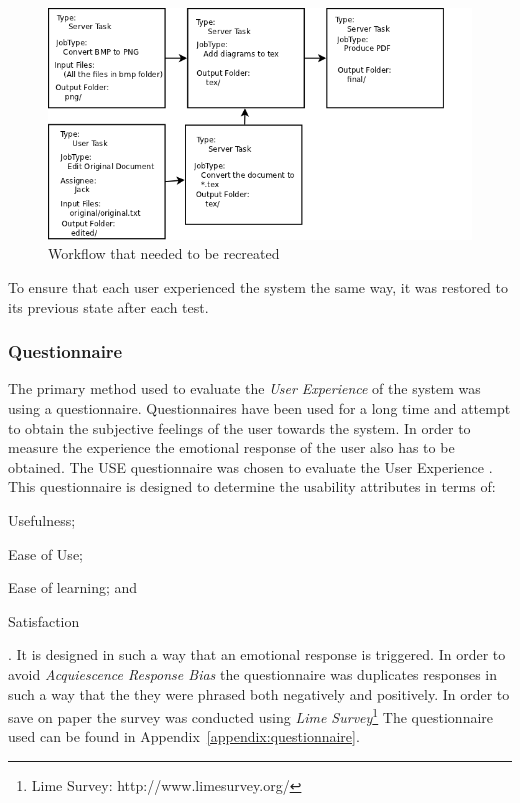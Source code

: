 \documentclass[12pt,a4paper]{report}
\begin{document}
\begin{figure}[!h]
    \begin{center}
        \includegraphics[scale=0.45]{figures/workflow.png}
    \end{center}
    \caption{Workflow that needed to be recreated}
    \label{eval:workflow}
\end{figure}
To ensure that each user experienced the system the same way, it was restored to
its previous state after each test. 

\subsubsection{Questionnaire}
The primary method used to evaluate the \emph{User Experience} of the system was
using a questionnaire. Questionnaires have been used for a long time and attempt
to obtain the subjective feelings of the user towards the
system\cite{Chin:1988:DIM:57167.57203}. In order to measure the experience the
emotional response of the user also has to be obtained. The USE questionnaire
was chosen to evaluate the User Experience \cite{lund2001measuring}. This
questionnaire is designed to determine the usability attributes in terms of:
\begin{inparaenum}[(i)]\item Usefulness;\item Ease of Use; \item Ease of learning; and \item
Satisfaction \end{inparaenum}. It is designed in such a way that an
emotional response is triggered. In order to avoid \emph{Acquiescence Response Bias}
the questionnaire was duplicates responses in such a way that the they were
phrased both negatively and positively\cite{schriesheim1981controlling}. 
In order to save on paper the survey was conducted using \emph{Lime
Survey}\footnote{Lime Survey: http://www.limesurvey.org/}
The questionnaire used can be found in Appendix~\ref{appendix:questionnaire}.
\end{document}
